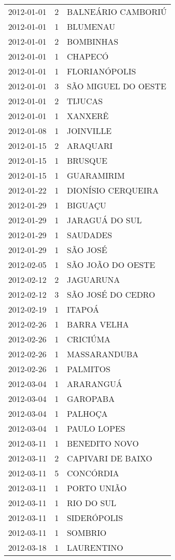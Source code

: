 \begin{longtable}[htbp]{ccl}
2012-01-01 & 2 & BALNEÁRIO CAMBORIÚ \\
2012-01-01 & 1 & BLUMENAU \\
2012-01-01 & 2 & BOMBINHAS \\
2012-01-01 & 1 & CHAPECÓ \\
2012-01-01 & 1 & FLORIANÓPOLIS \\
2012-01-01 & 3 & SÃO MIGUEL DO OESTE \\
2012-01-01 & 2 & TIJUCAS \\
2012-01-01 & 1 & XANXERÊ \\
2012-01-08 & 1 & JOINVILLE \\
2012-01-15 & 2 & ARAQUARI \\
2012-01-15 & 1 & BRUSQUE \\
2012-01-15 & 1 & GUARAMIRIM \\
2012-01-22 & 1 & DIONÍSIO CERQUEIRA \\
2012-01-29 & 1 & BIGUAÇU \\
2012-01-29 & 1 & JARAGUÁ DO SUL \\
2012-01-29 & 1 & SAUDADES \\
2012-01-29 & 1 & SÃO JOSÉ \\
2012-02-05 & 1 & SÃO JOÃO DO OESTE \\
2012-02-12 & 2 & JAGUARUNA \\
2012-02-12 & 3 & SÃO JOSÉ DO CEDRO \\
2012-02-19 & 1 & ITAPOÁ \\
2012-02-26 & 1 & BARRA VELHA \\
2012-02-26 & 1 & CRICIÚMA \\
2012-02-26 & 1 & MASSARANDUBA \\
2012-02-26 & 1 & PALMITOS \\
2012-03-04 & 1 & ARARANGUÁ \\
2012-03-04 & 1 & GAROPABA \\
2012-03-04 & 1 & PALHOÇA \\
2012-03-04 & 1 & PAULO LOPES \\
2012-03-11 & 1 & BENEDITO NOVO \\
2012-03-11 & 2 & CAPIVARI DE BAIXO \\
2012-03-11 & 5 & CONCÓRDIA \\
2012-03-11 & 1 & PORTO UNIÃO \\
2012-03-11 & 1 & RIO DO SUL \\
2012-03-11 & 1 & SIDERÓPOLIS \\
2012-03-11 & 1 & SOMBRIO \\
2012-03-18 & 1 & LAURENTINO \\

\end{longtable}
